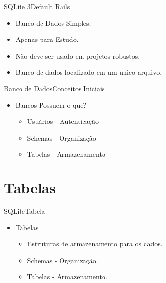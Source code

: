 \documentclass{beamer}
\begin{document}
\begin{frame}[fragile]{SQLite 3}{Default Rails}
	\begin{itemize}  \itemsep 2em
		\item{ \LARGE Banco de Dados Simples.}
		\item{ \LARGE Apenas para Estudo.}
		\item{ \LARGE Não deve ser usado em projetos robustos.}
		\item{ \LARGE Banco de dados localizado em um unico arquivo.}
								
	\end{itemize}
\end{frame}


\begin{frame}{Banco de Dados}{Conceitos Iniciais}
	\begin{itemize} 
		\item{
			\LARGE Bancos Possuem o que?
			\begin{itemize} \itemsep 2em
				\item{ \Large Usuários - Autenticação}
				\item{ \Large Schemas - Organização}
				\item{ \Large Tabelas - Armazenamento}
			\end{itemize}
		}
	\end{itemize}
\end{frame}

\section{Tabelas}
\begin{frame}{SQLite}{Tabela}
	\begin{itemize} 
		\item{
			\LARGE Tabelas
			\begin{itemize} \itemsep 2em
				\item{ \Large Estruturas de armazenamento para os dados.}
				\item{ \Large Schemas - Organização.}
				\item{ \Large Tabelas - Armazenamento.}
			\end{itemize}
		}
	\end{itemize}
\end{frame}
\end{document}
